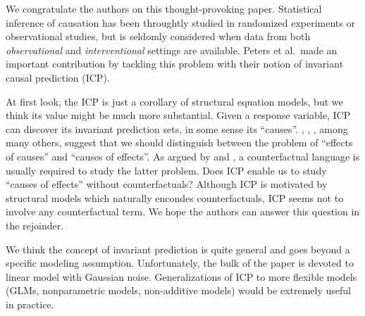 \documentclass{article}
\begin{document}
\maketitle

\newcommand{\tr}{\text{tr}}
\newcommand{\E}{\textbf{E}}
\newcommand{\diag}{\text{diag}}
\newcommand{\argmax}{\text{argmax}}
\newcommand{\Cov}{\text{Cov}}
\newcommand{\Var}{\text{Var}}
\newcommand{\argmin}{\text{argmin}}
\newcommand{\Vol}{\text{Vol}}
\newcommand{\comm}[1]{}

We congratulate the authors on this thought-provoking
paper. Statistical inference of causation has been throughtly studied
in randomized experiments or observational studies, but is seldomly
considered when data from both \emph{observational}
and \emph{interventional} settings are available. Peters et
al.\ made an important contribution by tackling this problem with
their notion of invariant causal prediction (ICP).

At first look, the ICP is just a corollary of structural
equation models, but we think its value might be much more
substantial. Given a response variable, ICP can discover its invariant
prediction sets, in some sense its
``causes''. \citet{holland1986statistics}, \citet{dawid2000causal},
\citet{pearl2000causality}, among many others, suggest that we should
distinguish between the problem of ``effects of causes'' and ``causes
of effects''. As argued by \citet{robins2000causal} and
\citet{pearl2000causality}, a counterfactual language is usually
required to study the latter problem. Does ICP enable us to study
``causes of effects'' without counterfactuals? Although ICP is
motivated by structural models which naturally encondes
counterfactuals, ICP seems not to involve any counterfactual term. We
hope the authors can answer this question in the rejoinder.

We think the concept of invariant prediction is quite
general and goes beyond a specific modeling assumption. Unfortunately,
the bulk of the paper is devoted to linear model with Gaussian
noise. Generalizations of ICP to more flexible models (GLMs,
nonparametric models, non-additive models) would be extremely useful
in practice.
\end{document}
